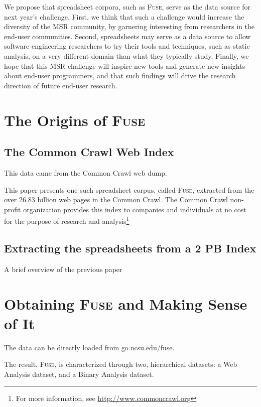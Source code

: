 \documentclass[conference]{IEEEtran}
\begin{document}
We propose that spreadsheet corpora, such as \textsc{Fuse}, serve as the data source for next year's challenge. First, we think that such a challenge would increase the diversity of the MSR community, by garnering interesting from researchers in the end-user communities. Second, spreadsheets may serve as a data source to allow software engineering researchers to try their tools and techniques, such as static analysis, on a very different domain than what they typically study. Finally, we hope that this MSR challenge will inspire new tools and generate new insights about end-user programmers, and that such findings will drive the research direction of future end-user research.


\section{The Origins of \textsc{Fuse}}

\subsection{The Common Crawl Web Index}

This data came from the Common Crawl web dump.

This paper presents one such spreadsheet corpus, called \textsc{Fuse}, extracted from the over 26.83 billion web pages in the Common Crawl. 
The Common Crawl non-profit organization provides this index to companies and individuals at no cost for the purpose of research and analysis\footnote{For more information, see \url{http://www.commoncrawl.org}}

\subsection{Extracting the spreadsheets from a 2 PB Index}

A brief overview of the previous paper


\section{Obtaining \textsc{Fuse} and Making Sense of It}

The data can be directly loaded from go.ncsu.edu/fuse.

The result, \textsc{Fuse}, is characterized through two, hierarchical datasets: a Web Analysis dataset, and a Binary Analysis dataset.
\end{document}

